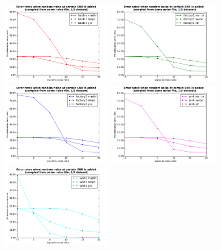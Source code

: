 \documentclass[11pt,a4paper]{report}
\begin{document}
\begin{figure}[htbp]
  \centering
  \includegraphics[width=0.49\textwidth]{error_rates_random_noise_wrt_snr_babble.pdf}
  \includegraphics[width=0.49\textwidth]{error_rates_random_noise_wrt_snr_factory1.pdf}
  \includegraphics[width=0.49\textwidth]{error_rates_random_noise_wrt_snr_factory2.pdf}
  \includegraphics[width=0.49\textwidth]{error_rates_random_noise_wrt_snr_pink.pdf}
  \includegraphics[width=0.49\textwidth]{error_rates_random_noise_wrt_snr_white.pdf}

\end{figure}
\end{document}
